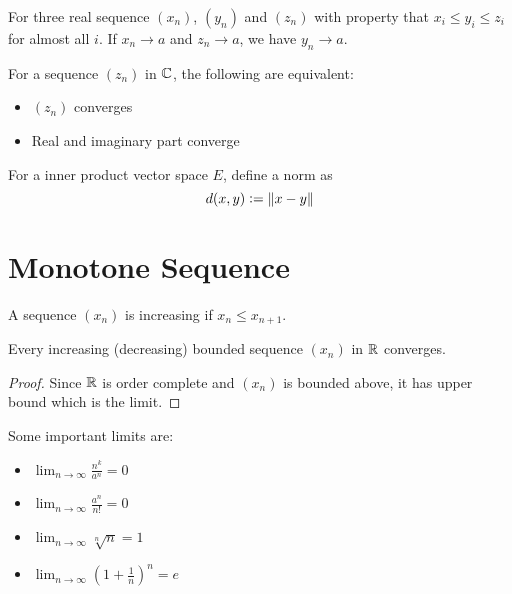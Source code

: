 \begin{theorem}
    For three real sequence $(x_n)$, $(y_n)$ and $(z_n)$ with property that $x_i \leq y_i \leq z_i$ for almost all $i$. If $x_n \rightarrow a$ and $z_n \rightarrow a$, we have $y_n \rightarrow a$.
\end{theorem}

\begin{theorem}
    For a sequence $(z_n)$ in $\mathbb{C}$, the following are equivalent:
    \begin{itemize}
        \item $(z_n)$ converges
        \item Real and imaginary part converge
    \end{itemize}
\end{theorem}

\begin{definition}
    For a inner product vector space $E$, define a norm as 
    \begin{equation}
        d(x,y) := \displaystyle \left\lVert x - y \right\rVert
    \end{equation}
\end{definition}




%
%
%
%

\section{Monotone Sequence}

\begin{definition}[increasing]
    A sequence $(x_n)$ is increasing if $x_n \leq x_{n+1}$.
\end{definition}

\begin{theorem}
    Every increasing (decreasing) bounded sequence $(x_n)$ in $\mathbb{R}$ converges. 
\end{theorem}
\begin{proof}
    Since $\mathbb{R}$ is order complete and $(x_n)$ is bounded above, it has upper bound which is the limit.
\end{proof}

Some important limits are:
\begin{itemize}
    \item $\displaystyle \lim_{n \rightarrow \infty} \frac{n^k}{a^n} = 0$
    \item $\displaystyle \lim_{n \rightarrow \infty} \frac{a^n}{n!} = 0$
    \item $\displaystyle \lim_{n \rightarrow \infty} \sqrt[n]{n} = 1$
    \item $\displaystyle \lim_{n \rightarrow \infty} \left(1+\frac{1}{n} \right)^n = e$
\end{itemize}


